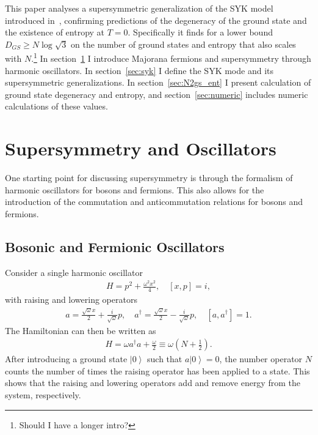 \documentclass[12pt]{article} %
\renewcommand{\th}[1]{\frac{1}{#1}}
\newcommand{\om}{\omega}
\newcommand{\ket}[1]{\left|#1\right\rangle}
\newcommand{\comm}[2]{\left[#1,#2\right]}
\begin{document}
This paper analyses a supersymmetric generalization of the SYK model introduced in~\cite{fu16}, confirming predictions of the degeneracy of the ground state and the existence of entropy at $T=0$. Specifically it finds for a lower bound $D_{GS}\ge N\log\sqrt{3}$ on the number of ground states and entropy that also scales with $N$.\footnote{Should I have a longer intro?} In section~\ref{sec:osc} I introduce Majorana fermions and supersymmetry through harmonic oscillators. In section~\ref{sec:syk} I define the SYK mode and its supersymmetric generalizations. In section~\ref{sec:N2gs_ent} I present calculation of ground state degeneracy and entropy, and section~\ref{sec:numeric} includes numeric calculations of these values.


\section{Supersymmetry and Oscillators} \label{sec:osc}

One starting point for discussing supersymmetry is through the formalism of harmonic oscillators for bosons and fermions. This also allows for the introduction of the commutation and anticommutation relations for bosons and fermions.

\subsection{Bosonic and Fermionic Oscillators} \emph{} \label{sub:bf_osc}

Consider a single harmonic oscillator 
\begin{align}
H = p^2 +\frac{\om^2 x^2}{4},\quad \comm{x}{p} = i, \label{eqn:harmosc}
\end{align}
with raising and lowering operators
\begin{align}
a = \frac{\sqrt{\om}x}{2}+\frac{i}{\sqrt{\om}}p,\quad a^\dag = \frac{\sqrt{\om 
	}x}{2}-\frac{i}{\sqrt{\om}}p,\quad \comm{a}{a^\dag } = 1.
\end{align}
The Hamiltonian can then be written as 
\begin{align}
H = \om a^\dag a + \frac{\om}{2} \equiv \om \left(N + \th{2}\right).
\end{align}
After introducing a ground state $\ket{0}$ such that $a\ket{0} = 0$, the number operator $N$ counts the number of times the raising operator has been applied to a state. This shows that the raising and lowering operators add and remove energy from the system, respectively. 
\end{document}
